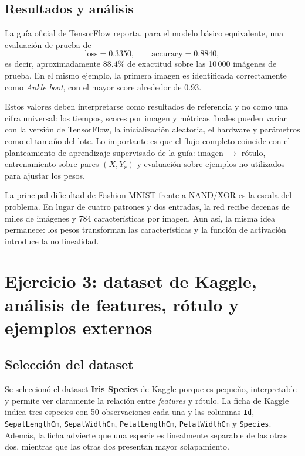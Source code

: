\documentclass[14pt,twoside]{article}
\begin{document}
\subsection{Resultados y análisis}

La guía oficial de TensorFlow reporta, para el modelo básico equivalente, una evaluación de prueba de
\[
\text{loss}=0.3350,
\qquad
\text{accuracy}=0.8840,
\]
es decir, aproximadamente $88.4\%$ de exactitud sobre las 10\,000 imágenes de prueba. En el mismo ejemplo, la primera imagen es identificada correctamente como \emph{Ankle boot}, con el mayor score alrededor de 0.93. \cite{tensorflowfashion}

Estos valores deben interpretarse como resultados de referencia y no como una cifra universal: los tiempos, scores por imagen y métricas finales pueden variar con la versión de TensorFlow, la inicialización aleatoria, el hardware y parámetros como el tamaño del lote. Lo importante es que el flujo completo coincide con el planteamiento de aprendizaje supervisado de la guía: imagen $\rightarrow$ rótulo, entrenamiento sobre pares $(X,Y_r)$ y evaluación sobre ejemplos no utilizados para ajustar los pesos. \cite{martinez2026,tensorflowfashion}

La principal dificultad de Fashion-MNIST frente a NAND/XOR es la escala del problema. En lugar de cuatro patrones y dos entradas, la red recibe decenas de miles de imágenes y 784 características por imagen. Aun así, la misma idea permanece: los pesos transforman las características y la función de activación introduce la no linealidad.

\section{Ejercicio 3: dataset de Kaggle, análisis de features, rótulo y ejemplos externos}

\subsection{Selección del dataset}

Se seleccionó el dataset \textbf{Iris Species} de Kaggle porque es pequeño, interpretable y permite ver claramente la relación entre \emph{features} y rótulo. La ficha de Kaggle indica tres especies con 50 observaciones cada una y las columnas \texttt{Id}, \texttt{SepalLengthCm}, \texttt{SepalWidthCm}, \texttt{PetalLengthCm}, \texttt{PetalWidthCm} y \texttt{Species}. Además, la ficha advierte que una especie es linealmente separable de las otras dos, mientras que las otras dos presentan mayor solapamiento. \cite{kaggleiris}
\end{document}
